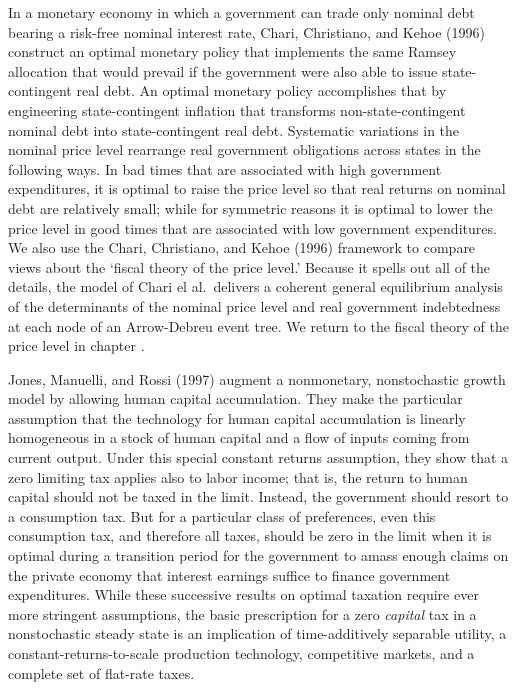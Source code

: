 %
In a monetary economy in which  a government  can trade only
nominal debt bearing a risk-free nominal interest rate,
Chari, Christiano, and Kehoe (1996)
construct an optimal monetary policy that implements the same Ramsey allocation that
would prevail if the government were also  able to  issue state-contingent real debt.
An optimal monetary policy accomplishes that by engineering state-contingent inflation that  transforms
 non-state-contingent nominal  debt into
state-contingent real debt. Systematic variations in the nominal
price level rearrange real government obligations across states in the following ways.
In bad times that are associated with high government expenditures, it is
optimal to raise the price level so that real returns on nominal debt are relatively small;
while for symmetric reasons it is  optimal to lower the price level in
good times that are  associated with low government expenditures. We also
use the Chari, Christiano, and Kehoe (1996) framework to compare   views about the
`fiscal theory of the price level.' Because it  spells out all of the details, the model of Chari el al.\ delivers a
coherent general equilibrium analysis of the determinants of the
nominal price level and real government indebtedness at each node
of an Arrow-Debreu event tree. We return to the
fiscal theory of the price level in chapter .


Jones, Manuelli, and Rossi (1997)
augment a nonmonetary, nonstochastic growth model by allowing human capital accumulation. They
make the  particular assumption that the technology for human
capital accumulation is linearly homogeneous in a stock of human
capital and a flow of  inputs coming from current output. Under
this special constant returns assumption, they show that a zero
limiting tax applies also to labor income; that is, the return to
human capital should not be taxed in the limit. Instead, the
government should resort to a consumption tax. But for a particular class of preferences,
even this
consumption tax, and therefore all taxes, should be zero in the
limit  when it is optimal
during a transition period
for the government to amass enough
claims on the private economy that  interest earnings suffice
to finance government expenditures.
While these successive results on optimal taxation
require ever more stringent assumptions, the
basic prescription for a zero {\it capital\/} tax in a
nonstochastic steady state is an  implication of
time-additively separable   utility, \newpage \noindent  a
constant-returns-to-scale production technology,
competitive markets, and a complete set of flat-rate taxes.

